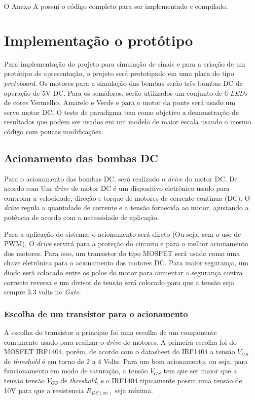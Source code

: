 O Anexo A possui o código completo para ser implementado e compilado. 


\section{Implementação o protótipo }

Para implementação do projeto para simulação de sinais e para a criação de um protótipo de apresentação, o projeto será prototipado em uma placa do tipo \textit{protoboard}. Os motores para a simulação das bombas serão três bombas DC de operação de 5V DC. Para os semáforos, serão utilizados um conjunto de 6 \textit{LEDs} de cores Vermelho, Amarelo e Verde e para o motor da ponte será usado um servo motor DC. O teste de paradigma tem como objetivo a demonstração de resultados que podem ser usados em um modelo de maior escala usando o mesmo código com poucas modificações.

\subsection{Acionamento das bombas DC}

Para o acionamento das bombas DC, será realizado o \textit{drive} do motor DC. De acordo com \cite{hashid} Um \textit{drive} de motor DC é um dispositivo eletrônico usado para controlar a velocidade, direção e torque de motores de corrente contínua (DC). O \textit{drive} regula a quantidade de corrente e a tensão fornecida ao motor, ajustando a potência de acordo com a necessidade de aplicação.

Para a aplicação do sistema, o acionamento será direto (Ou seja, sem o uso de PWM). O \textit{drive} servirá para a proteção do circuito e para o melhor acionamento dos motores. Para isso, um transistor do tipo MOSFET será usado como uma chave eletrônica para o acionamento dos motores DC. Para maior segurança, um diodo será colocado entre os polos do motor para aumentar a segurança contra corrente reversa e um divisor de tensão será colocado para que a tensão seja sempre 3.3 volts no \textit{Gate}.

\subsubsection{Escolha de um transistor para o acionamento}

A escolha do transistor a principio foi uma escolha de um componente comumente usado para realizar o \textit{drive} de motores. A primeira escolha foi do MOSFET IRF1404, porém, de acordo com o datasheet do IRF1404 \cite{IRF1404_datasheet} a tensão $V_{GS}$ de \textit{threshold} é em torno de 2 a 4 Volts. Para um bom acionamento, ou seja, para funcionamento em modo de saturação, a tensão $V_{GS}$ tem que ser maior que a tensão tensão $V_{GS}$ de \textit{threshold}, e o IRF1404 tipicamente possui uma tensão de 10V para que a resistencia $R_{DS(on)}$ seja mínima.

